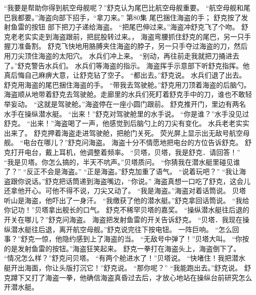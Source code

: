 \documentclass[a4paper,12pt,UTF8,twoside]{ctexbook}
\begin{document}
        “我要是帮助你得到航空母舰呢？”舒克认为尾巴比航空母舰重要。 
        “航空母舰和尾巴我都要。”海盗向部下招手，“拿刀来。”   第80集 
        尾巴捆住海盗的手； 
        舒克按了发射鱼雷的按钮   
        部下把刀子递给海盗。 
        “把尾巴伸过来。”海盗冲舒克飞了个吻。 
        舒克老老实实走到海盗跟前，把屁股转过来。， 
        海盗弯腰抓住舒克的尾巴，另一只手握刀准备割。 
        舒克飞快地用胳膊夹住海盗的脖子，另一只手夺过海盗的刀，然后用刀尖顶住海盗的太阳穴。 
        水兵们冲上来。 
        “别动，再往前走我就把刀捅进去了。”舒克警告水兵们。 
        水兵们等海盗的指示。 
        海盗挥手示意部下听舒克指挥。他真后悔自己麻痹大意，让舒克钻了空子。 
        “都出去。”舒克说。 
        水兵们退了出去。 
        舒克用海盗的尾巴捆住海盗的手。 
        “带我去驾驶舱。”舒克用刀顶着海盗的后脑勺。 
        海盗顺从地带着舒克去驾驶舱。走廊里的水兵们死盯着舒克手中的刀，谁也不敢轻举妄动。 
        “这就是驾驶舱。”海盗停在一座小圆门跟前。 
        舒克推开门，里边有两名水手在操纵潜水艇。 
        “出来！”舒克对驾驶舱里的水手说。 
        “你是谁？”水手没见过舒克。 
        “出来！”海盗喝了一声，他感觉到后脑勺上的刀尖有变化。 
        水兵老老实实出来了。 
        舒克押着海盗走进驾驶舱，把舱门关死。 
        荧光屏上显示出无敌号航空母舰。 
        “电台在哪儿？”舒克问海盗。 
        海盗十分不情愿地把电台的方位告诉舒克。 
        舒克打开电台，戴上耳机，他调整着频率。 
        “贝塔，贝塔，我是舒克．请回答！” 
        “我是贝塔。你怎么搞的，半天不吭声。”贝塔质问。 
        “你猜我在潜水艇里碰见谁了？” 
        “反正不会是海盗。” 
        “正是海盗。”舒克加重了语气。 
        “说着玩吧？” 
        “我让海盗跟你说话。”舒克把话筒递到海盗嘴边，“你说。” 
        海盗真想一口吃了舒克，这会儿还拿他开心。可他不得不说，刀尖又动了。 
        “我是海盗。”海盗对着话筒说。 
        贝塔听山是海盗，他吓出了一身汗。 
        “我缴获了他的潜水艇。”舒克拿回话筒说。 
        “我给你记功！”贝塔拿出舰长的口气。 
        舒克不稀罕贝塔的嘉奖。 
        “操纵潜水艇往后退的开关在哪儿？”舒克问海盗。 
        海盗把发射鱼雷的开关告诉舒克。 
        “贝塔．我现在操纵潜水艇往后退，离开航空母舰。”舒克说完往下按电钮。 
        一阵巨响。 
        “怎么回事？”舒克一惊，他隐约感到上了海盗的当。 
        “无敌号中弹了！”贝塔大叫。 
        “你按的是发射鱼雷的按钮。”海盗狂笑起来。 
        舒克一拳打在海盗头上，海盗倒下了。 
        “情况怎么样？”舒克问贝塔。 
        “有两个舱进水了！”贝塔说。 
        “快堵住！我把潜水艇开出海面，你让头版打沉它！”舒克说。 
        “那你呢？” 
        “我能跑出去。”舒克说。 
        舒克蹲下又打了海盗一拳，他确信海盗真昏过去后，才放心地站在操纵台前研究怎么开潜水艇。 
\end{document}
